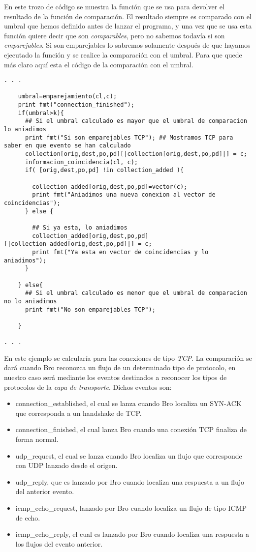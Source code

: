 \noindent En este trozo de código se muestra la función que se usa para devolver 
el resultado de la función de comparación. El resultado siempre es comparado 
con el umbral que hemos definido antes de lanzar el programa, y una vez que se 
usa esta función quiere decir que son \textit{comparables}, pero no sabemos todavía si son 
\textit{emparejables}. Si son emparejables lo sabremos solamente después de 
que hayamos ejecutado la función y se realice la comparación con el umbral. Para que 
quede más claro aquí esta el código de la comparación con el umbral.

\begin{lstlisting}[style=CodigoC]
. . .

	umbral=emparejamiento(cl,c);
    print fmt("connection_finished");
    if(umbral>k){
      ## Si el umbral calculado es mayor que el umbral de comparacion lo aniadimos
      print fmt("Si son emparejables TCP"); ## Mostramos TCP para saber en que evento se han calculado
      collection[orig,dest,po,pd][|collection[orig,dest,po,pd]|] = c;
      informacion_coincidencia(cl, c);
      if( [orig,dest,po,pd] !in collection_added ){

        collection_added[orig,dest,po,pd]=vector(c);
        print fmt("Aniadimos una nueva conexion al vector de coincidencias");
      } else {

        ## Si ya esta, lo aniadimos
        collection_added[orig,dest,po,pd][|collection_added[orig,dest,po,pd]|] = c;
        print fmt("Ya esta en vector de coincidencias y lo aniadimos");
      }

    } else{
      ## Si el umbral calculado es menor que el umbral de comparacion no lo aniadimos
      print fmt("No son emparejables TCP");

    }
    
. . .
\end{lstlisting}

\noindent En este ejemplo se calcularía para las conexiones de tipo \textit{TCP}.
\intro
La comparación se dará cuando Bro reconozca un flujo de un determinado tipo 
de protocolo, en nuestro caso será mediante los eventos destinados a 
reconocer los tipos de protocolos de la \textit{capa de transporte}.
Dichos eventos son:

\begin{itemize}
\item connection\_established, el cual se lanza cuando Bro localiza un SYN-ACK que corresponda a un handshake de TCP.
\item connection\_finished, el cual lanza Bro cuando una conexión TCP finaliza de forma normal. 
\item udp\_request, el cual se lanza cuando Bro localiza un flujo que corresponde con UDP lanzado desde el origen.
\item udp\_reply, que es lanzado por Bro cuando localiza una respuesta a un flujo del anterior evento.
\item icmp\_echo\_request, lanzado por Bro cuando localiza un flujo de tipo ICMP de echo.
\item icmp\_echo\_reply, el cual es lanzado por Bro cuando localiza una respuesta a los flujos del evento anterior.
\end{itemize}

